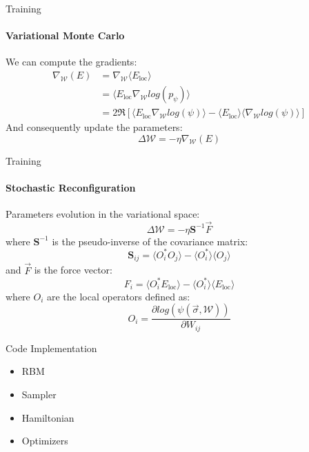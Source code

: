 \documentclass{beamer}
\begin{document}
\begin{frame}{Training}
\framesubtitle{Variational Monte Carlo}
We can compute the gradients:
\begin{equation*}
\begin{aligned}
    \nabla_{\mathcal{W}} \left(E\right) &= \nabla_{\mathcal{W}} \langle E_{\text{loc}} \rangle \\
    &= \langle E_{\text{loc}} \nabla_{\mathcal{W}} log(p_{\psi}) \rangle \\
    &= 2 \mathfrak{R} \left[ \langle E_{\text{loc}} \nabla_{\mathcal{W}} log(\psi) \rangle - \langle E_{\text{loc}} \rangle \langle \nabla_{\mathcal{W}} log(\psi) \rangle \right]
\end{aligned}
\end{equation*}
And consequently update the parameters:
$$\Delta \mathcal{W} = - \eta \nabla_{\mathcal{W}} \left(E\right)$$
\end{frame}

\begin{frame}{Training}
\framesubtitle{Stochastic Reconfiguration}
Parameters evolution in the variational space:
$$\Delta \mathcal{W} = - \eta \mathbf{S}^{-1} \vec{F}$$
where $\mathbf{S}^{-1}$ is the pseudo-inverse of the covariance matrix:
$$\mathbf{S}_{ij} = \langle O_i^{*} O_j \rangle - \langle O_i^{*} \rangle \langle O_j \rangle$$
and $\vec{F}$ is the force vector:
$$F_i = \langle O_i^{*} E_{\text{loc}} \rangle - \langle O_i^{*} \rangle \langle E_{\text{loc}} \rangle$$
where $O_i$ are the local operators defined as:
$$O_i = \frac{\partial log\left(\psi\left( \vec{\sigma}, \mathcal{W} \right)\right)}{\partial W_{ij}}$$

\end{frame}

\begin{chapter}{}{Code Implementation}
\begin{itemize}
    \item RBM
    \item Sampler
    \item Hamiltonian
    \item Optimizers
\end{itemize}
\end{chapter}
\end{document}

